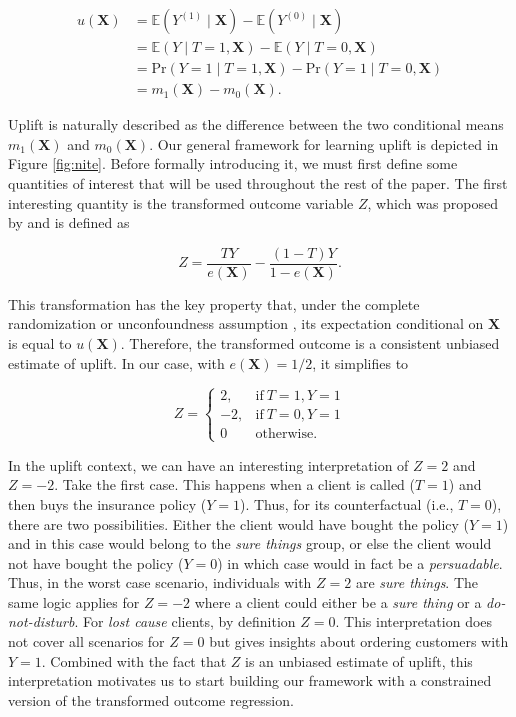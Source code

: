 \documentclass{article}
\def\X{\mathbf X}
\begin{document}
\begin{align}
    u(\X) &= \mathbb{E} ( Y^{(1)} \mid \X) - \mathbb{E} ( Y^{(0)} \mid \X) \nonumber\\
     &= \mathbb{E} ( Y \mid T=1, \X) - \mathbb{E} ( Y \mid T=0, \X) \nonumber \\
     &= \mathrm{Pr} ( Y = 1 \mid T=1, \X) - \mathrm{Pr} ( Y = 1 \mid T=0, \X) \nonumber \\
      &=m_1(\X) - m_0(\X). 
    \label{eq:uplift}
\end{align}


Uplift is naturally described as the difference between the two conditional means $m_1(\X)$ and $m_0(\X)$. Our general framework for learning uplift is depicted in Figure \ref{fig:nite}. Before formally introducing it, we must first define some quantities of interest that will be used throughout the rest of the paper. The first interesting quantity is the transformed outcome variable $Z$, which was proposed by \citep{athey2015machine} and is defined as  

\begin{equation}
    Z =  \frac{T Y}{e(\X)} - \frac{(1 - T) Y}{1 - e(\X)}.
    \label{eq:transformed_outcome}
\end{equation}

This transformation has the key property that, under the complete randomization or unconfoundness assumption \citep{rosenbaum1983central}, its expectation conditional on $\X$ is equal to $u(\X)$. Therefore, the transformed outcome is a consistent unbiased estimate of uplift. In our case, with $e(\X) = 1/2$, it simplifies to

\[ Z = \begin{cases} 
      2, & \mathrm{if}~T=1, Y=1 \\
      -2, & \mathrm{if}~T=0, Y=1 \\
      0 & \mathrm{otherwise.} 
   \end{cases}
\]

In the uplift context, we can have an interesting interpretation of $Z=2$ and $Z=-2$. Take the first case. This happens when a client is called ($T = 1$) and then buys the insurance policy ($Y = 1$). Thus, for its counterfactual (i.e., $T = 0$), there are two possibilities. Either the client would have bought the policy ($Y = 1$) and in this case would belong to the \textit{sure things} group, or else the client would not have bought the policy ($Y = 0$) in which case would in fact be a \textit{persuadable}. Thus, in the worst case scenario, individuals with $Z = 2$ are \textit{sure things}. The same logic applies for $Z = -2$ where a client could either be a \textit{sure thing} or a \textit{do-not-disturb}. For \textit{lost cause} clients, by definition $Z = 0$. This interpretation does not cover all scenarios for $Z=0$ but gives insights about ordering customers with $Y=1$. Combined with the fact that $Z$ is an unbiased estimate of uplift, this interpretation motivates us to start building our framework with a constrained version of the transformed outcome regression.
\end{document}
